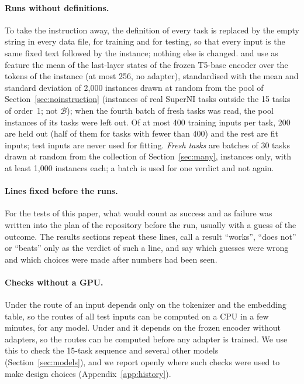 \paragraph{Runs without definitions.} To take the instruction away, the definition of every task
is replaced by the empty string in every data file, for training and for testing, so that every
input is the same fixed text followed by the instance; nothing else is changed. \recog{} and
\handicap{} use as feature the mean of the last-layer states of the frozen T5-base encoder over the
tokens of the instance (at most 256, no adapter), standardised with the mean and standard deviation
of 2{,}000 instances drawn at random from the pool of Section~\ref{sec:noinstruction} (instances of
real SuperNI tasks outside the 15 tasks of order~1; not $\mathcal{B}$); when the fourth batch of
fresh tasks was read, the pool instances of its tasks were left out. Of at most 400 training inputs per task, 200 are held out (half of
them for tasks with fewer than 400) and the rest are fit inputs; test inputs are never used for
fitting. \emph{Fresh tasks} are batches of 30 tasks drawn at random from the collection of
Section~\ref{sec:many}, instances only, with at least 1{,}000 instances each; a batch is used for
one verdict and not again.

\paragraph{Lines fixed before the runs.} For the tests of this paper, what would count as success
and as failure was written into the plan of the repository before the run, usually with a guess of
the outcome. The results sections repeat these lines, call a result ``works'', ``does not'' or
``beats'' only as the verdict of such a line, and say which guesses were wrong and which choices
were made after numbers had been seen.

\paragraph{Checks without a GPU.} Under \cert{} the route of an input depends only on the tokenizer and the
embedding table, so the routes of all test inputs can be computed on a CPU in a few minutes, for
any model. Under \recog{} and \handicap{} it depends on the frozen encoder without adapters, so the routes can be computed before any adapter is trained. We use this to check the 15-task sequence and several other models
(Section~\ref{sec:models}), and we report openly where such checks were used to make design choices
(Appendix~\ref{app:history}).
